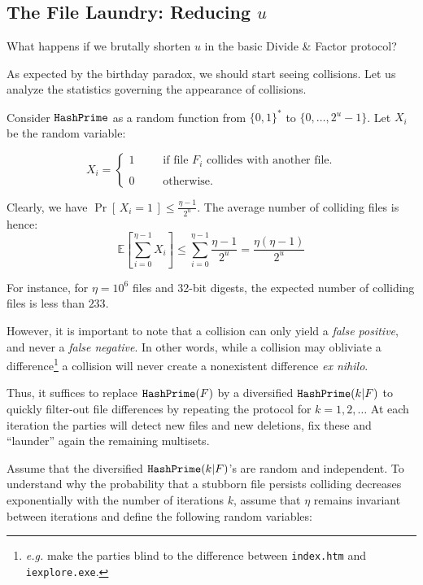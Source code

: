 \documentclass[11pt]{llncs}
\newcommand{\Prob}[1]{{\Pr\left[\,{#1}\,\right]}}
\newcommand{\EE}[1]{{\mathbb{E}\left[{#1}\right]}}
\begin{document}
\subsection{The File Laundry: Reducing $u$}

What happens if we brutally shorten $u$ in the basic Divide \& Factor protocol?\smallskip

As expected by the birthday paradox, we should start seeing collisions. Let us analyze the statistics governing the appearance of collisions.

Consider $\mbox{{\tt HashPrime}}$ as a random function from $\{0,1\}^*$ to $\{0,\dots,2^u-1\}$. Let $X_i$ be the random variable:

$$
X_i =
\left\{
\begin{array}{lcl}
1 & ~~~~&  \mbox{if file $F_i$ collides with another file.}\\
\\
0 & ~~~~&  \mbox{otherwise.}
\end{array}
\right.
$$

Clearly, we have $\Prob{X_i = 1} \le \frac{\eta -1}{2^u}$.
The average number of colliding files is hence:
\[ \EE{\sum_{i=0}^{\eta-1} X_i} \le \sum_{i=0}^{\eta-1} \frac{\eta -1}{2^u} = \frac{\eta (\eta - 1)}{2^u} \]

For instance, for $\eta=10^6$ files and 32-bit digests, the expected number of colliding files is less than $233$.\smallskip

However, it is important to note that a collision can only yield a {\sl false positive}, and never a {\sl false negative}. In other words, while a collision may obliviate a difference\footnote{{\sl e.g.} make the parties blind to the difference between {\tt index.htm} and {\tt iexplore.exe}.} a collision will never create a nonexistent difference {\sl ex nihilo}.\smallskip

Thus, it suffices to replace $\mbox{{\tt HashPrime}}(F)$ by a diversified $\mbox{{\tt HashPrime}}(k|F)$ to quickly filter-out file differences by repeating the protocol for $k=1,2,\ldots$ At each iteration the parties will detect new files and new deletions, fix these and ``launder'' again the remaining multisets.\smallskip

Assume that the diversified $\mbox{{\tt HashPrime}}(k|F)$'s are random and independent. To understand why the probability that a stubborn file persists colliding decreases exponentially with the number of iterations $k$, assume that $\eta$ remains invariant between iterations and define the following random variables:\smallskip
\end{document}
